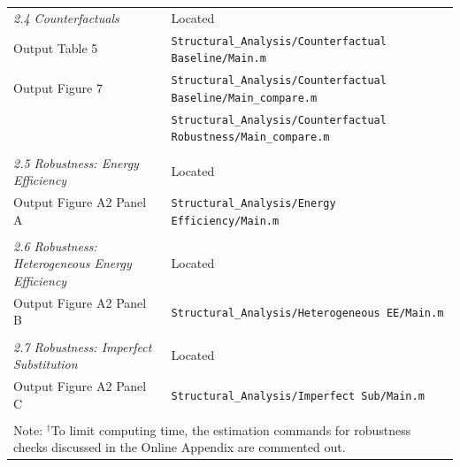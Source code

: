 \documentclass[12pt,notitlepage]{article}
\begin{document}
\begin{table}[t]
{\begin{tabular}{ll}
\emph{2.4  Counterfactuals} & Located    \\
Output Table 5 & \texttt{Structural\_Analysis/Counterfactual Baseline/Main.m} \\ 
Output Figure 7 & \texttt{Structural\_Analysis/Counterfactual Baseline/Main\_compare.m} \\
              & \texttt{Structural\_Analysis/Counterfactual Robustness/Main\_compare.m} \\ \\ 

\emph{2.5  Robustness: Energy Efficiency} & Located \\
Output Figure A2 Panel A & \texttt{Structural\_Analysis/Energy Efficiency/Main.m} \\ \\

\emph{2.6  Robustness: Heterogeneous Energy Efficiency} & Located \\
Output Figure A2 Panel B & \texttt{Structural\_Analysis/Heterogeneous EE/Main.m} \\ \\

\emph{2.7  Robustness: Imperfect Substitution} & Located \\
Output Figure A2 Panel C & \texttt{Structural\_Analysis/Imperfect Sub/Main.m} \\ \\
\bottomrule
\multicolumn{2}{l}{Note: $^\dagger$To limit computing time, the estimation commands for robustness checks discussed in the Online Appendix are commented out. } \\ 
\end{tabular}}
\end{table}
\end{document}
